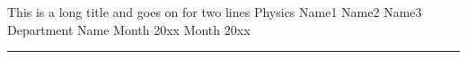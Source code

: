 \documentclass[a4paper,12pt]{book}   %
\author{Samarth Ganesh Kashyap}  %
\begin{document}
\thispagestyle{empty}
\tifrtitle
{This is a long title and}              %
{goes on for two lines}                 %
{Physics}                               %
{Name1 Name2 Name3}                     %
{Department Name}                       %
{Month 20xx}                            %
{Month 20xx}                            %
%
%
%
%
%
\frontmatter
\newpage 
\newpage 
\newpage 
\newpage 
\newpage 
\newpage
\tableofcontents
\newpage 
%
\newpage
{}
\listoffigures

\listoftables
\mainmatter
\renewcommand{\chaptermark}[1]{\markboth{\thechapter.\ #1}{}}
\renewcommand{\headrulewidth}{1pt}        %
\pagestyle{fancy}
\fancyhf{}
\fancyhead[LO, RE]{\thepage}              %
\fancyhead[RO]{\nouppercase{\leftmark}}   %
\fancyhead[LE]{\nouppercase{\rightmark}}  %
\begin{center}\rule{2cm}{2pt}\end{center}
\end{document}
